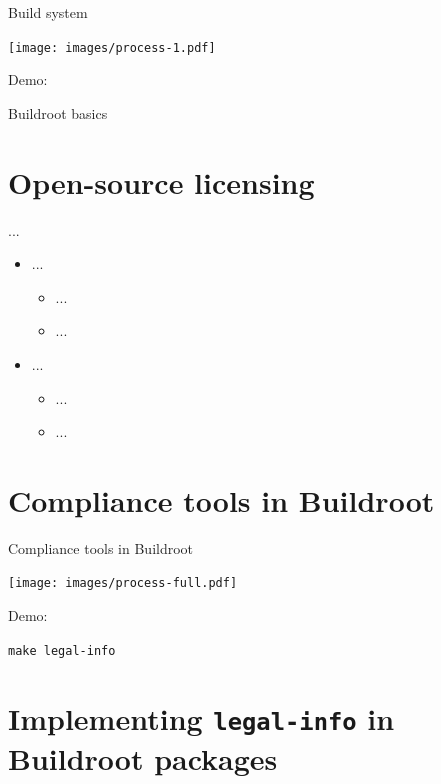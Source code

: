 \documentclass[xetex,table]{beamer}
\begin{document}
\begin{frame}{Build system}
  \begin{center}
    \texttt{[image: images/process-1.pdf]}
  \end{center}
\end{frame}

\begin{frame}[standout]
  Demo:

  Buildroot basics
\end{frame}


\section{Open-source licensing}

\begin{frame}{...}
  \begin{itemize}
  \item ...
    \begin{itemize}
    \item ...
    \item ...
    \end{itemize}
  \item ...
    \begin{itemize}
    \item ...
    \item ...
    \end{itemize}
  \end{itemize}
\end{frame}


\section{Compliance tools in Buildroot}

\begin{frame}{Compliance tools in Buildroot}
  \begin{center}
    \texttt{[image: images/process-full.pdf]}
  \end{center}
\end{frame}

\begin{frame}[standout]
  Demo:

  {\tt make legal-info}
\end{frame}


\section[Implementing {\tt legal-info}\\in Buildroot packages]
        {Implementing {\tt legal-info}  in Buildroot packages}
\end{document}

